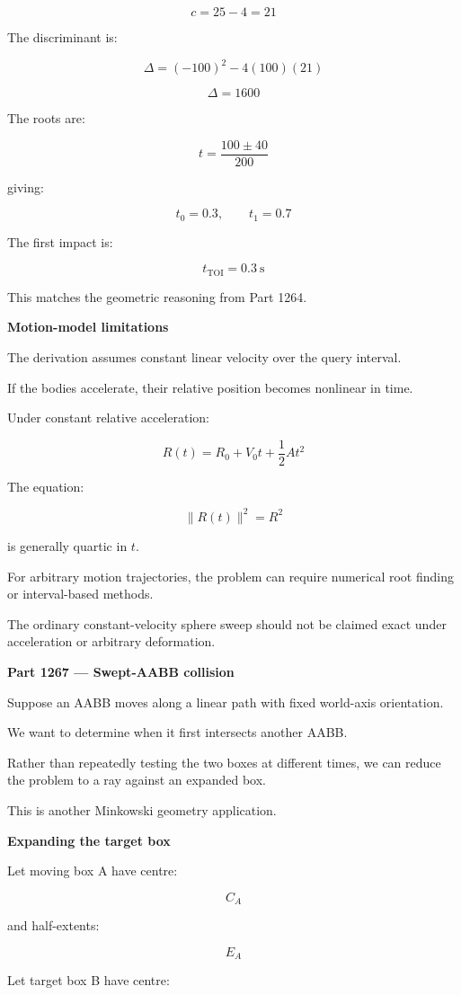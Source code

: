 \[
c=25-4=21
\]

The discriminant is:

\[
\Delta=(-100)^2-4(100)(21)
\]

\[
\Delta=1600
\]

The roots are:

\[
t=\frac{100\pm40}{200}
\]

giving:

\[
t_0=0.3,\qquad t_1=0.7
\]

The first impact is:

\[
\boxed{t_{\mathrm{TOI}}=0.3\ \mathrm{s}}
\]

This matches the geometric reasoning from Part 1264.

\textbf{Motion-model limitations}

The derivation assumes constant linear velocity over the query interval.

If the bodies accelerate, their relative position becomes nonlinear in time.

Under constant relative acceleration:

\[
R(t)=R_0+V_0t+\frac12At^2
\]

The equation:

\[
\|R(t)\|^2=R^2
\]

is generally quartic in \(t\).

For arbitrary motion trajectories, the problem can require numerical root finding or interval-based methods.

The ordinary constant-velocity sphere sweep should not be claimed exact under acceleration or arbitrary deformation.

\textbf{Part 1267 --- Swept-AABB collision}

Suppose an AABB moves along a linear path with fixed world-axis orientation.

We want to determine when it first intersects another AABB.

Rather than repeatedly testing the two boxes at different times, we can reduce the problem to a ray against an expanded box.

This is another Minkowski geometry application.

\textbf{Expanding the target box}

Let moving box A have centre:

\[
C_A
\]

and half-extents:

\[
E_A
\]

Let target box B have centre:


